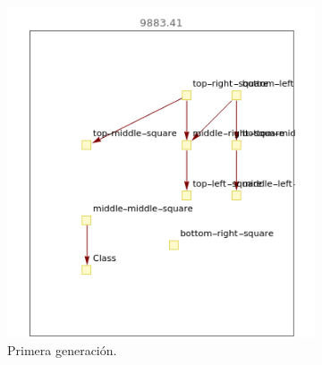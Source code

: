 \documentclass[10pt,a4paper]{article}
\begin{document}
\begin{figure}[htb!]
\begin{subfigure}[b]{0.475\textwidth}
            \includegraphics[width=\textwidth]{img/tic-tac-toe/first.png}
            \caption[ ]{{Primera generación.}}
        \end{subfigure}
        \hfill
        \begin{subfigure}[b]{0.475\textwidth}
            \centering 

\end{subfigure}
\end{figure}
\end{document}
